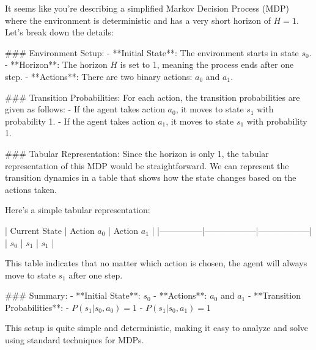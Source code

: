 It seems like you're describing a simplified Markov Decision Process (MDP) where the environment is deterministic and has a very short horizon of \( H = 1 \). Let's break down the details:

### Environment Setup:
- **Initial State**: The environment starts in state \( s_0 \).
- **Horizon**: The horizon \( H \) is set to 1, meaning the process ends after one step.
- **Actions**: There are two binary actions: \( a_0 \) and \( a_1 \).

### Transition Probabilities:
For each action, the transition probabilities are given as follows:
- If the agent takes action \( a_0 \), it moves to state \( s_1 \) with probability 1.
- If the agent takes action \( a_1 \), it moves to state \( s_1 \) with probability 1.

### Tabular Representation:
Since the horizon is only 1, the tabular representation of this MDP would be straightforward. We can represent the transition dynamics in a table that shows how the state changes based on the actions taken.

Here’s a simple tabular representation:

| Current State | Action \( a_0 \) | Action \( a_1 \) |
|---------------|------------------|------------------|
| \( s_0 \)     | \( s_1 \)         | \( s_1 \)         |

This table indicates that no matter which action is chosen, the agent will always move to state \( s_1 \) after one step.

### Summary:
- **Initial State**: \( s_0 \)
- **Actions**: \( a_0 \) and \( a_1 \)
- **Transition Probabilities**:
  - \( P(s_1 | s_0, a_0) = 1 \)
  - \( P(s_1 | s_0, a_1) = 1 \)

This setup is quite simple and deterministic, making it easy to analyze and solve using standard techniques for MDPs.
